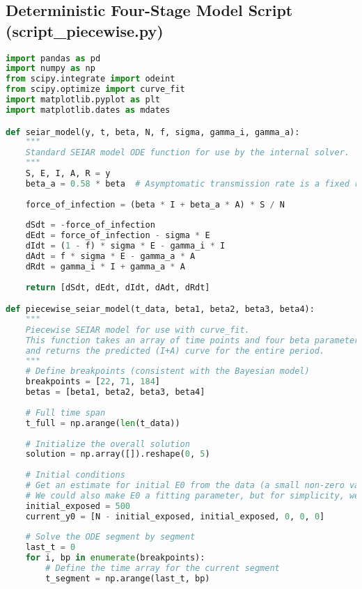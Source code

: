 \subsection{Deterministic Four-Stage Model Script (script\_piecewise.py)}
\begin{lstlisting}[language=Python, caption={Python script for fitting a four-stage piecewise deterministic SEIAR model, aligning with the Bayesian model's structure.}]
import pandas as pd
import numpy as np
from scipy.integrate import odeint
from scipy.optimize import curve_fit
import matplotlib.pyplot as plt
import matplotlib.dates as mdates

def seiar_model(y, t, beta, N, f, sigma, gamma_i, gamma_a):
    """
    Standard SEIAR model ODE function for use by the internal solver.
    """
    S, E, I, A, R = y
    beta_a = 0.58 * beta  # Asymptomatic transmission rate is a fixed relative proportion
    
    force_of_infection = (beta * I + beta_a * A) * S / N
    
    dSdt = -force_of_infection
    dEdt = force_of_infection - sigma * E
    dIdt = (1 - f) * sigma * E - gamma_i * I
    dAdt = f * sigma * E - gamma_a * A
    dRdt = gamma_i * I + gamma_a * A
    
    return [dSdt, dEdt, dIdt, dAdt, dRdt]

def piecewise_seiar_model(t_data, beta1, beta2, beta3, beta4):
    """
    Piecewise SEIAR model for use with curve_fit.
    This function takes an array of time points and four beta parameters,
    and returns the predicted (I+A) curve for the entire period.
    """
    # Define breakpoints (consistent with the Bayesian model)
    breakpoints = [22, 71, 184]
    betas = [beta1, beta2, beta3, beta4]
    
    # Full time span
    t_full = np.arange(len(t_data))
    
    # Initialize the overall solution
    solution = np.array([]).reshape(0, 5)
    
    # Initial conditions
    # Get an estimate for initial E0 from the data (a small non-zero value)
    # We could also make E0 a fitting parameter, but for simplicity, we use a reasonable estimate here.
    initial_exposed = 500 
    current_y0 = [N - initial_exposed, initial_exposed, 0, 0, 0]
    
    # Solve the ODE segment by segment
    last_t = 0
    for i, bp in enumerate(breakpoints):
        # Define the time array for the current segment
        t_segment = np.arange(last_t, bp)
        

\end{lstlisting}
